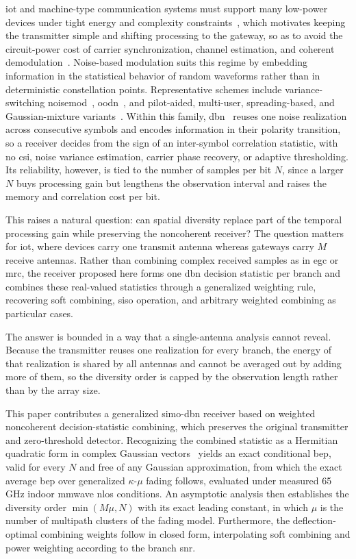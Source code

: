 \documentclass[12pt, draftclsnofoot, onecolumn]{IEEEtran}
\newcommand{\rev}[1]{#1}
\begin{document}
\Ac{iot} and machine-type communication systems must support
many low-power devices under tight energy and complexity constraints~\cite{Wang},
which motivates keeping the transmitter simple and shifting processing to the
gateway, so as to avoid the circuit-power cost of carrier synchronization,
channel estimation, and coherent demodulation~\cite{Kapetanovic_2022,Basar_2023}.
Noise-based modulation suits this regime by embedding information in the
statistical behavior of random waveforms rather than in deterministic
constellation points. Representative schemes include
variance-switching \ac{noisemod}~\cite{Basar_2024},
\ac{oodn}~\cite{OriginalPaper,oodn_exact}, and pilot-aided, multi-user,
spreading-based, and Gaussian-mixture variants~\cite{Shen_2025,Yapici_2024,%
NoiseModSpread,NoiseMod3D}. Within this family,
\ac{dbn}~\cite{dbn_2026} reuses one noise realization across consecutive symbols and
encodes information in their polarity transition, so a receiver decides from the
sign of an inter-symbol correlation statistic, with no \ac{csi}, noise variance estimation, carrier phase recovery, or adaptive
thresholding. Its reliability, however, is tied to the number of samples per bit
$N$, since a larger $N$ buys processing gain but lengthens the observation
interval and raises the memory and correlation cost per bit.

This raises a natural question: can spatial diversity replace part of the
temporal processing gain while preserving the noncoherent receiver? The question
matters for \ac{iot}, where devices carry one transmit antenna whereas gateways carry
$M$ receive antennas. Rather than combining complex received samples as in
\ac{egc} or \ac{mrc}, the receiver
proposed here forms one \ac{dbn} decision statistic per branch and combines these
real-valued statistics through a generalized weighting rule, recovering soft
combining, \ac{siso} operation, and arbitrary weighted
combining as particular cases.

\rev{The answer is bounded in a way that a single-antenna analysis cannot reveal.
Because the transmitter reuses one realization for every branch, the energy of
that realization is shared by all antennas and cannot be averaged out by adding
more of them, so the diversity order is capped by the observation length rather
than by the array size.}

This paper contributes a generalized \ac{simo}-\ac{dbn}
receiver based on weighted noncoherent decision-statistic combining, which
preserves the original transmitter and zero-threshold detector. \rev{Recognizing
the combined statistic as a Hermitian quadratic form in complex Gaussian
vectors~\cite{Turin_1960}
yields an exact conditional \ac{bep}, valid for every $N$
and free of any Gaussian approximation, from which the exact
average \ac{bep} over generalized $\kappa$-$\mu$ fading follows, evaluated under
measured 65\,GHz indoor \ac{mmwave} \ac{nlos} conditions. An asymptotic analysis then establishes the diversity
order $\min(M\mu,N)$ with its exact leading constant, in which $\mu$ is the
number of multipath clusters of the fading model. Furthermore, the
deflection-optimal combining weights follow in closed form, interpolating soft
combining and power weighting according to the branch \ac{snr}.}
\end{document}
